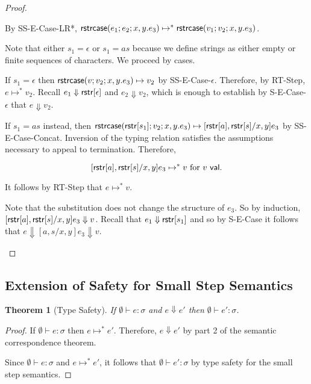 \documentclass[11pt,leqno]{article}
\newtheorem{thm}{Theorem}
\theoremstyle{definition}
\newcommand{\sistr}[1]{{\sf rstr}[#1]}   \newcommand{\rstr}[1]{{\sf rstr}[#1]} %
\newcommand{\val}{{\sf val}}
\newcommand{\strin}[1]{\sistr{#1}}
\newcommand{\strcase}[3]{ {\sf rstrcase}(#1; #2; #3)}
\newcommand{\sreduces}{ \Downarrow }
\begin{document}
\begin{proof}
\begin{itemize}[label=$ $,itemsep=1ex]
By SS-E-Case-LR*, $\strcase{e_1}{e_2}{x,y.e_3} \mapsto^* \strcase{v_1}{v_2}{x,y.e_3}$.

Note that either $s_1 = \epsilon$ or $s_1 = as$ because we define strings as either empty or finite sequences of characters.
We proceed by cases.

If $s_1 = \epsilon$ then $\strcase{v}{v_2}{x,y.e_3} \mapsto v_2$ by SS-E-Case-$\epsilon$.
Therefore, by RT-Step, $e \mapsto^* v_2$.
Recall $e_1 \sreduces \strin{\epsilon}$ and $e_2 \sreduces v_2$, which is enough to establish by S-E-Case-$\epsilon$ that $e \sreduces v_2$.

If $s_1 = as$ instead, then $\strcase{\strin{s_1}}{v_2}{x,y.e_3} \mapsto [\strin{a},\strin{s} / x,y ] e_3$ by SS-E-Case-Concat.
Inversion of the typing relation satisfies the assumptions necessary to appeal to termination.
Therefore,

\[ [\strin{a},\strin{s} / x,y ] e_3 \mapsto^* v \text{ for } v \ \val. \]

It follows by RT-Step that $e \mapsto^* v$.

Note that the substitution does not change the structure of $e_3$.
So by induction, $[\strin{a},\strin{s} / x,y ] e_3 \sreduces v$.
Recall that $e_1 \sreduces \strin{s_1}$ and so by S-E-Case it follows that $e \sreduces [a,s / x,y] e_3 \sreduces v$.
\end{itemize}

\end{proof}


\subsection{Extension of Safety for Small Step Semantics}

\begin{thm}[Type Safety] \label{thm:typesafety}
  If $\emptyset \vdash e : \sigma$ 
  and $e \sreduces e'$ then $\emptyset \vdash e' : \sigma$.
\end{thm}
\begin{proof}
If $\emptyset \vdash e : \sigma$ then $e \mapsto^* e'$.
Therefore, $e \sreduces e'$ by part 2 of the semantic correspondence theorem.

Since $\emptyset \vdash e : \sigma$ and $e \mapsto^* e'$, it follows that $\emptyset \vdash e' : \sigma$ by type safety for the small step semantics.
\end{proof}
\end{document}
